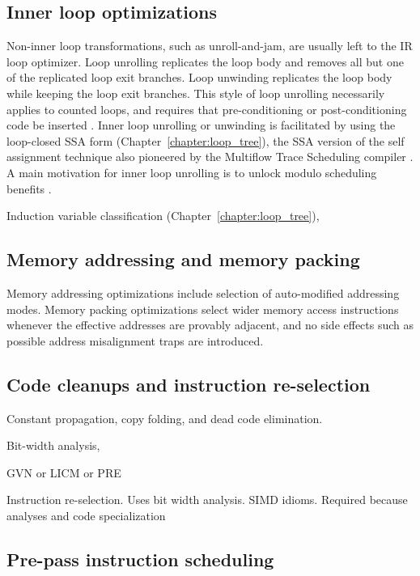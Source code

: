 \subsection{Inner loop optimizations}

Non-inner loop transformations, such as
unroll-and-jam, are usually left to the IR loop optimizer. Loop unrolling
replicates the loop body and removes all but one of the replicated loop exit
branches. Loop unwinding replicates the loop body while keeping the loop exit
branches. This style of loop unrolling necessarily applies to counted loops, and
requires that pre-conditioning or post-conditioning code be inserted
\cite{Lowney:1993:JS}. Inner loop unrolling or unwinding is facilitated by using
the loop-closed SSA form (Chapter~\ref{chapter:loop_tree}), the SSA version of the
self assignment technique also pioneered by the Multiflow Trace Scheduling
compiler \cite{Lowney:1993:JS}. A main motivation for inner loop unrolling is to
unlock modulo scheduling benefits \cite{Lavery:1995:MICRO}.

Induction variable classification (Chapter~\ref{chapter:loop_tree}),



\subsection{Memory addressing and memory packing}

Memory addressing optimizations include selection of auto-modified addressing
modes. Memory packing optimizations select wider memory access instructions
whenever the effective addresses are provably adjacent, and no side effects such
as possible address misalignment traps are introduced.

\subsection{Code cleanups and instruction re-selection}

Constant propagation, copy folding, and dead code elimination.

Bit-width analysis,

GVN or LICM or PRE

Instruction re-selection. Uses bit width analysis. SIMD idioms.
Required because analyses and code specialization

\subsection{Pre-pass instruction scheduling}


